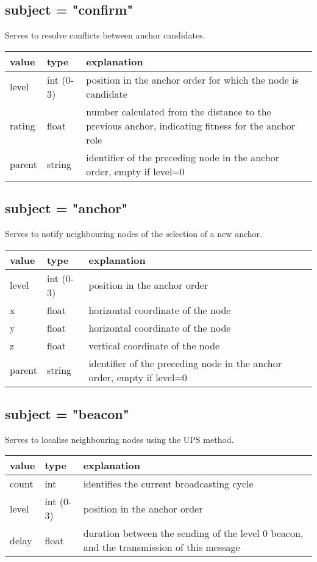 \documentclass[12pt,a4paper,fleqn]{report}
\begin{document}
\begin{appendices}
\subsection*{subject = "confirm"}

Serves to resolve conflicts between anchor candidates.

\begin{tabular}{|p{2cm}|p{2cm}|p{10cm}|}
	\hline
	\textbf{value} & \textbf{type} & \textbf{explanation} \\
	\hline
	level	& int (0-3)	&
	position in the anchor order for which the node is candidate \\
	\hline
	rating	& float		&
	number calculated from the distance to the previous anchor, indicating fitness for the anchor role \\
	\hline
	parent	& string	&
	identifier of the preceding node in the anchor order, empty if level=0 \\
	\hline
\end{tabular}

\subsection*{subject = "anchor"}

Serves to notify neighbouring nodes of the selection of a new anchor.

\begin{tabular}{|p{2cm}|p{2cm}|p{10cm}|}
	\hline
	\textbf{value} & \textbf{type} & \textbf{explanation} \\
	\hline
	level	& int (0-3)	&
	position in the anchor order \\
	\hline
	x		& float		&
	horizontal coordinate of the node \\
	\hline
	y		& float		&
	horizontal coordinate of the node \\
	\hline
	z		& float		&
	vertical coordinate of the node \\
	\hline
	parent	& string	&
	identifier of the preceding node in the anchor order, empty if level=0 \\
	\hline
\end{tabular}

\subsection*{subject = "beacon"}

Serves to localise neighbouring nodes using the UPS method.

\begin{tabular}{|p{2cm}|p{2cm}|p{10cm}|}
	\hline
	\textbf{value} & \textbf{type} & \textbf{explanation} \\
	\hline
	count	& int		&
	identifies the current broadcasting cycle \\
	\hline
	level	& int (0-3)	&
	position in the anchor order \\
	\hline
	delay	& float		&
	duration between the sending of the level 0 beacon, and the transmission of this message \\
	\hline
\end{tabular}


\end{appendices}
\end{document}
